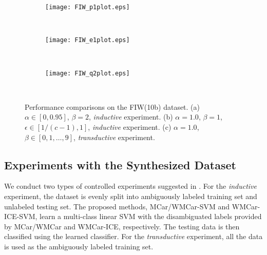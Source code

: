 \documentclass[10pt,journal,compsoc]{IEEEtran}
\begin{document}
\begin{figure*}
        \centering
        \begin{subfigure}[b]{0.32\textwidth}
                \texttt{[image: FIW\_p1plot.eps]}
                \caption{}\label{fig:fiw10b_a}
        \end{subfigure}\,
        \begin{subfigure}[b]{0.32\textwidth}
                \texttt{[image: FIW\_e1plot.eps]}
                \caption{}\label{fig:fiw10b_b}
        \end{subfigure}\,
       \begin{subfigure}[b]{0.32\textwidth}
                \texttt{[image: FIW\_q2plot.eps]}
                \caption{}\label{fig:fiw10b_c}
        \end{subfigure}\,
        \caption{Performance comparisons on the FIW(10b) dataset. (a) $\alpha \in [0, 0.95]$, $\beta=2$, \emph{inductive} experiment. (b) $\alpha= 1.0$, $\beta =1$, $\epsilon \in [1/(c-1), 1]$, \emph{inductive} experiment. (c) $\alpha= 1.0$, $\beta  \in [0,1, \dots, 9]$, \emph{transductive} experiment.}
        \label{fig:lfw_set}
\end{figure*}

\subsection{Experiments with the Synthesized Dataset}
We conduct two types of controlled experiments suggested in \cite{Cour2011}.  For the \emph{inductive} experiment, the dataset is evenly split into ambiguously labeled training set and unlabeled testing set. The proposed methods, MCar/WMCar-SVM and WMCar-ICE-SVM, learn a multi-class linear SVM \cite{CC01a} with the disambiguated labels provided by MCar/WMCar and WMCar-ICE, respectively. The testing data is then classified using the learned classifier.
For the \emph{transductive} experiment, all the data is used as the ambiguously labeled training set.
\end{document}
